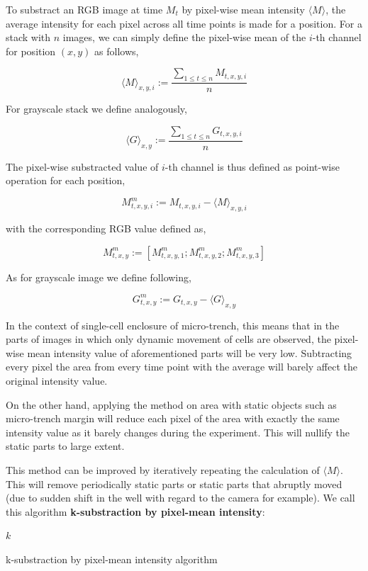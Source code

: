 \documentclass[pdftex,12pt,a4paper]{report}
\newcommand{\forcond}{$i=0$ \KwTo $k - 1$}
\begin{document}
To substract an RGB image at time $M_t$ by pixel-wise mean intensity $\langle{M}\rangle$, the average intensity for each pixel across all time points is made for a position. For a stack with $n$ images, we can simply define the pixel-wise mean of the $i$-th channel for position $(x, y)$ as follows,

$$
\langle M \rangle_{x, y, i} := \frac{\sum_{1 \leq t \leq n} M_{t, x, y, i}}{n}
$$

For grayscale stack we define analogously,

$$
\langle G \rangle_{x, y} := \frac{\sum_{1 \leq t \leq n} G_{t, x, y, i}}{n}
$$

The pixel-wise substracted value of $i$-th channel is thus defined as point-wise operation for each position,

\begin{equation}
M^m_{t, x, y, i} := M_{t, x, y, i} - \langle M \rangle_{x, y, i}
\end{equation}

with the corresponding RGB value defined as,

$$
M^m_{t, x, y} := [M^m_{t, x, y, 1}; M^m_{t, x, y, 2}; M^m_{t, x, y, 3}]
$$

As for grayscale image we define following,

\begin{equation}
G^m_{t, x, y} := G_{t, x, y} - \langle G \rangle_{x, y}
\end{equation}

In the context of single-cell enclosure of micro-trench, this means that in the parts of images in which only dynamic movement of cells are observed, the pixel-wise mean intensity value of aforementioned parts will be very low. Subtracting every pixel the area from every time point with the average will barely affect the original intensity value.

On the other hand, applying the method on area with static objects such as micro-trench margin will reduce each pixel of the area with exactly the same intensity value as it barely changes during the experiment. This will nullify the static parts to large extent.

This method can be improved by iteratively repeating the calculation of $\langle M \rangle$. This will remove periodically static parts or static parts that abruptly moved (due to sudden shift in the well with regard to the camera for example). We call this algorithm \textbf{k-substraction by pixel-mean intensity}:

\begin{algorithm}[H]
 $k$ \;
 \For{\forcond}{
 	calculates $\langle M \rangle$ from $M_t$ \;
 	$M^m_t = M_t - \langle M \rangle$ \;
 	$M_t = M^m_t$ \; 
 }

\caption{k-substraction by pixel-mean intensity algorithm}
\label{algorithm:k_mean_substraction}
\end{algorithm}
\end{document}
